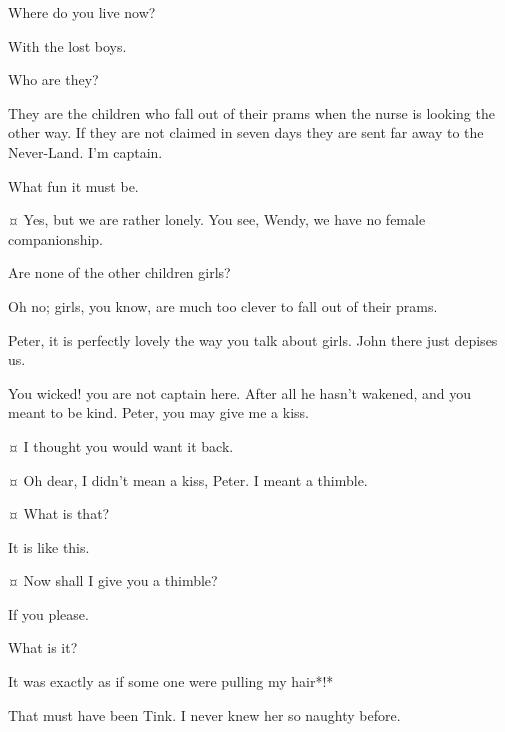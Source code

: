 \begin{drama}
\wendyspeaks
Where do you live now?

\peterspeaks
With the lost boys.

\wendyspeaks
Who are they?

\peterspeaks
They are the children who fall out of their prams when the nurse is looking the other way.
If they are not claimed in seven days they are sent far away to the Never-Land.
I'm captain.

\wendyspeaks
What fun it must be.

\peterspeaks {}¤
Yes, but we are rather lonely.
You see, Wendy, we have no female companionship.

\wendyspeaks
Are none of the other children girls?

\peterspeaks
Oh no; girls, you know, are much too clever to fall out of their prams.

\wendyspeaks
Peter, it is perfectly lovely the way you talk about girls.
John there just depises us.


\speakercontinues
You wicked!
you are not captain here.
After all he hasn't wakened, and you meant to be kind.
Peter, you may give me a kiss.

\peterspeaks {}¤
I thought you would want it back.

\wendyspeaks {}¤
Oh dear, I didn't mean a kiss, Peter.
I meant a thimble.

\peterspeaks {}¤
What is that?

\wendyspeaks
It is like this.

\peterspeaks {}¤
Now shall I give you a thimble?

\wendyspeaks
If you please.

\peterspeaks
What is it?

\wendyspeaks
It was exactly as if some one were pulling my hair*!*

\peterspeaks
That must have been Tink.
I never knew her so naughty before.



\end{drama}
